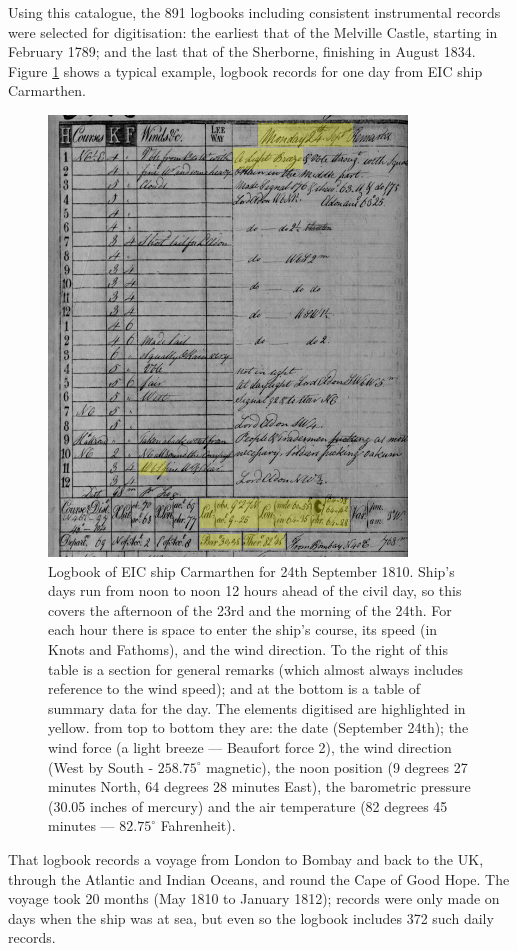 \documentclass[CP]{copernicus}
\begin{document}
Using this catalogue, the 891 logbooks including consistent instrumental records were selected for digitisation: the earliest that of the Melville Castle, starting in February 1789; and the last that of the Sherborne, finishing in August 1834. Figure \ref{Ftl1} shows a typical example, logbook records for one day from EIC ship Carmarthen.
\begin{figure}[!hbp]
\begin{center}
\includegraphics[angle=0, width=0.85\textwidth]{../figures/logbook_Carmarthen_Sept_24_1810+highlights}
\caption{Logbook of EIC ship Carmarthen for 24th September 1810. Ship's days run from noon to noon 12 hours ahead of the civil day, so this covers the afternoon of the 23rd and the morning of the 24th. For each hour there is space to enter the ship's course, its speed (in Knots and Fathoms), and the wind direction. To the right of this table is a section for general remarks (which almost always includes reference to the wind speed); and at the bottom is a table of summary data for the day. The elements digitised are highlighted in yellow. from top to bottom they are: the date (September 24th); the wind force (a light breeze --- Beaufort force 2), the wind direction (West by South - $258.75^\circ$ magnetic), the noon position (9 degrees 27 minutes North, 64 degrees 28 minutes East), the barometric pressure (30.05 inches of mercury) and the air temperature (82 degrees 45 minutes --- $82.75^\circ$ Fahrenheit).}
\label{Ftl1}
\end{center}
\end{figure}
That logbook records a voyage from London to Bombay and back to the UK, through the Atlantic and Indian Oceans, and round the Cape of Good Hope. The voyage took 20 months (May 1810 to January 1812); records were only made on days when the ship was at sea, but even so the logbook includes 372 such daily records.
\end{document}
